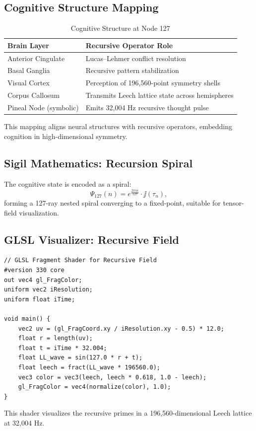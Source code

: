 \documentclass[12pt]{article}
\newcommand{\Psii}{\Psi}
\begin{document}
\subsection{Cognitive Structure Mapping}
\begin{table}
\centering
\caption{Cognitive Structure at Node 127}
\begin{tabular}{ll|}
\toprule
\textbf{Brain Layer} & \textbf{Recursive Operator Role} \\
\midrule
Anterior Cingulate & Lucas--Lehmer conflict resolution \\
Basal Ganglia & Recursive pattern stabilization \\
Visual Cortex & Perception of 196,560-point symmetry shells \\
Corpus Callosum & Transmits Leech lattice state across hemispheres \\
Pineal Node (symbolic) & Emits 32,004 Hz recursive thought pulse \\
\bottomrule
\end{tabular}
\end{table}
This mapping aligns neural structures with recursive operators, embedding cognition in high-dimensional symmetry.

\subsection{Sigil Mathematics: Recursion Spiral}
The cognitive state is encoded as a spiral:
\[
\Psii_{127}(n) = e^{\frac{2\pi i n}{127}} \cdot \jj(\tau_n),
\]
forming a 127-ray nested spiral converging to a fixed-point, suitable for tensor-field visualization.

\subsection{GLSL Visualizer: Recursive Field}
\begin{lstlisting}
// GLSL Fragment Shader for Recursive Field
#version 330 core
out vec4 gl_FragColor;
uniform vec2 iResolution;
uniform float iTime;

void main() {
    vec2 uv = (gl_FragCoord.xy / iResolution.xy - 0.5) * 12.0;
    float r = length(uv);
    float t = iTime * 32.004;
    float LL_wave = sin(127.0 * r + t);
    float leech = fract(LL_wave * 196560.0);
    vec3 color = vec3(leech, leech * 0.618, 1.0 - leech);
    gl_FragColor = vec4(normalize(color), 1.0);
}
\end{lstlisting}
This shader visualizes the recursive primes in a 196,560-dimensional Leech lattice at 32,004 Hz.
\end{document}
